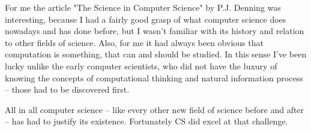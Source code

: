 \documentclass[a4paper,12pt]{article}
\begin{document}
For me the article "The Science in Computer Science" by P.J. Denning was interesting, because I had a fairly good grasp of what computer science does nowadays and has done before, but I wasn't familiar with its history and relation to other fields of science. Also, for me it had always been obvious that computation is something, that can and should be studied. In this sense I've been lucky unlike the early computer scientists, who did not have the luxury of knowing the concepts of computational thinking and natural information process -- those had to be discovered first.

All in all computer science -- like every other new field of science before and after -- has had to justify its existence. Fortunately CS did excel at that challenge.
\end{document}
